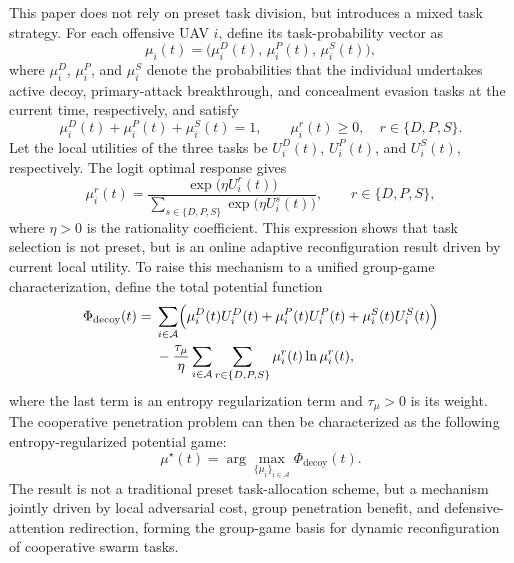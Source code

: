 \documentclass{cja}
\begin{document}
This paper does not rely on preset task division, but introduces a mixed task strategy. For each offensive UAV $i$, define its task-probability vector as
\begin{equation}
\mu_i(t)=
\bigl(
\mu_i^{D}(t),\,
\mu_i^{P}(t),\,
\mu_i^{S}(t)
\bigr),
\end{equation}
where $\mu_i^{D}$, $\mu_i^{P}$, and $\mu_i^{S}$ denote the probabilities that the individual undertakes active decoy, primary-attack breakthrough, and concealment evasion tasks at the current time, respectively, and satisfy
\begin{equation}
\mu_i^{D}(t)+\mu_i^{P}(t)+\mu_i^{S}(t)=1,\qquad
\mu_i^{r}(t)\ge 0,\quad r\in\{D,P,S\}.
\end{equation}
Let the local utilities of the three tasks be $U_i^{D}(t)$, $U_i^{P}(t)$, and $U_i^{S}(t)$, respectively. The logit optimal response gives
\begin{equation}
\mu_i^{r}(t)
=
\frac{\exp\!\bigl(\eta U_i^{r}(t)\bigr)}
{\sum\limits_{s\in\{D,P,S\}}\exp\!\bigl(\eta U_i^{s}(t)\bigr)},
\qquad r\in\{D,P,S\},
\label{eq:role-logit}
\end{equation}
where $\eta>0$ is the rationality coefficient. This expression shows that task selection is not preset, but is an online adaptive reconfiguration result driven by current local utility.
To raise this mechanism to a unified group-game characterization, define the total potential function
\begin{equation}
\begin{aligned}
\Phi_{\mathrm{decoy}}(t)
={}&
\sum_{i\in\mathcal{A}}
\Bigl(
\mu_i^{D}(t)U_i^{D}(t)
+
\mu_i^{P}(t)U_i^{P}(t)
+
\mu_i^{S}(t)U_i^{S}(t)
\Bigr)\\
&-
\frac{\tau_{\mu}}{\eta}
\sum_{i\in\mathcal{A}}
\sum_{r\in\{D,P,S\}}
\mu_i^{r}(t)\ln \mu_i^{r}(t),
\end{aligned}
\end{equation}
where the last term is an entropy regularization term and $\tau_{\mu}>0$ is its weight. The cooperative penetration problem can then be characterized as the following entropy-regularized potential game:
\begin{equation}
\mu^{\star}(t)
=
\arg\max_{\{\mu_i\}_{i\in\mathcal{A}}}
\Phi_{\mathrm{decoy}}(t).
\end{equation}
The result is not a traditional preset task-allocation scheme, but a mechanism jointly driven by local adversarial cost, group penetration benefit, and defensive-attention redirection, forming the group-game basis for dynamic reconfiguration of cooperative swarm tasks.
\end{document}
